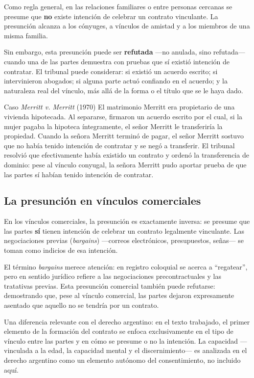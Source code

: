 \documentclass[12pt,oneside]{book}
\begin{document}
Como regla general, en las relaciones familiares o entre personas cercanas se presume que \textbf{no} existe intención de celebrar un contrato vinculante. La presunción alcanza a los cónyuges, a vínculos de amistad y a los miembros de una misma familia.

Sin embargo, esta presunción puede ser \textbf{refutada} ---no anulada, sino refutada--- cuando una de las partes demuestra con pruebas que sí existió intención de contratar. El tribunal puede considerar: si existió un acuerdo escrito; si intervinieron abogados; si alguna parte actuó confiando en el acuerdo; y la naturaleza real del vínculo, más allá de la forma o el título que se le haya dado.

\begin{example}{Caso \textit{Merritt v. Merritt} (1970)}
El matrimonio Merritt era propietario de una vivienda hipotecada. Al separarse, firmaron un acuerdo escrito por el cual, si la mujer pagaba la hipoteca íntegramente, el señor Merritt le transferiría la propiedad. Cuando la señora Merritt terminó de pagar, el señor Merritt sostuvo que no había tenido intención de contratar y se negó a transferir. El tribunal resolvió que efectivamente había existido un contrato y ordenó la transferencia de dominio: pese al vínculo conyugal, la señora Merritt pudo aportar prueba de que las partes sí habían tenido intención de contratar.
\end{example}

\subsection{La presunción en vínculos comerciales}

En los vínculos comerciales, la presunción es exactamente inversa: se presume que las partes \textbf{sí} tienen intención de celebrar un contrato legalmente vinculante. Las negociaciones previas (\textit{bargains}) ---correos electrónicos, presupuestos, señas--- se toman como indicios de esa intención.

El término \textit{bargains} merece atención: en registro coloquial se acerca a ``regatear'', pero en sentido jurídico refiere a las negociaciones precontractuales y las tratativas previas. Esta presunción comercial también puede refutarse: demostrando que, pese al vínculo comercial, las partes dejaron expresamente asentado que aquello no se tendría por un contrato.

\begin{note}
Una diferencia relevante con el derecho argentino: en el texto trabajado, el primer elemento de la formación del contrato se enfoca exclusivamente en el tipo de vínculo entre las partes y en cómo se presume o no la intención. La capacidad ---vinculada a la edad, la capacidad mental y el discernimiento--- es analizada en el derecho argentino como un elemento autónomo del consentimiento, no incluido aquí.
\end{note}
\end{document}
